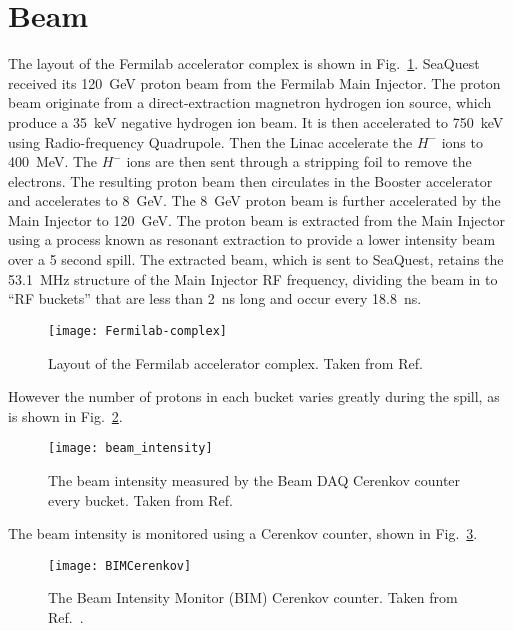 \documentclass[../main.tex]{subfiles}
\begin{document}
\section{Beam}
The layout of the Fermilab accelerator complex is shown in Fig.\ \ref{fig:complex}.
SeaQuest received its \SI{120}{\GeV} proton beam from the Fermilab Main Injector.
The proton beam originate from a direct-extraction magnetron hydrogen ion source,
which produce a \SI{35}{\keV} negative hydrogen ion beam. It is then accelerated
to \SI{750}{\keV} using Radio-frequency Quadrupole. Then the Linac accelerate the
$H^-$ ions to \SI{400}{\MeV}. The $H^-$ ions are then sent through a stripping foil
to remove the electrons. The resulting proton beam then circulates in the Booster
accelerator and accelerates to \SI{8}{\GeV}. The \SI{8}{\GeV} proton beam is
further accelerated by the Main Injector to \SI{120}{\GeV}. The proton beam is
extracted from the Main Injector using a process known as resonant extraction to
provide a lower intensity beam over a 5 second spill. The extracted beam, which
is sent to SeaQuest, retains the \SI{53.1}{\MHz} structure of the Main
Injector RF frequency, dividing the beam in to ``RF buckets'' that are less than
\SI{2}{\ns} long and occur every \SI{18.8}{\ns}.
\begin{figure}[htbp!]
	\centering
	\texttt{[image: Fermilab-complex]}
	\caption{Layout of the Fermilab accelerator complex. Taken from Ref.\ \cite{concept-book}}
	\label{fig:complex}
\end{figure}
However the number of protons in each bucket varies greatly during the spill, as
is shown in Fig.\ \ref{fig:intensity}.
\begin{figure}[htpb!]
	\centering
	\texttt{[image: beam\_intensity]}
	\caption{The beam intensity measured by the Beam DAQ Cerenkov counter every
		bucket. Taken from Ref.\ \cite{aidala2019}}
	\label{fig:intensity}
\end{figure}
The beam intensity is monitored using a Cerenkov counter, shown in Fig.\ \ref{fig:BIM}.
\begin{figure}[htbp!]
	\centering
	\texttt{[image: BIMCerenkov]}
	\caption{The Beam Intensity Monitor (BIM) Cerenkov counter. Taken from Ref.\
		\cite{aidala2019}.}
	\label{fig:BIM}
\end{figure}
\end{document}
